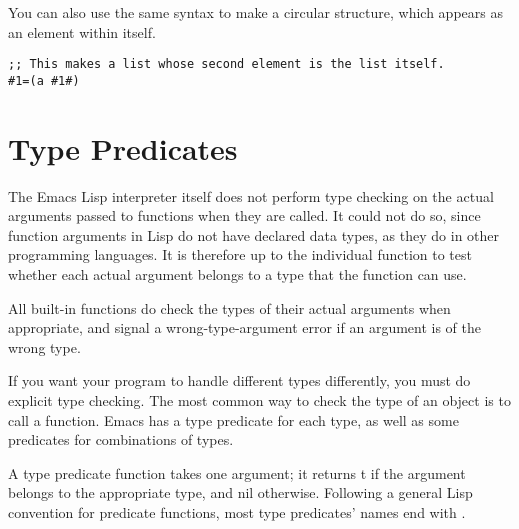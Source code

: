 You can also use the same syntax to make a circular structure, which appears as an element within itself. 
\begin{lstlisting}
;; This makes a list whose second element is the list itself.
#1=(a #1#)
\end{lstlisting}


\section{Type Predicates}
\label{sec:type-predicates}

The Emacs Lisp interpreter itself does not perform type checking on the actual arguments passed to functions when they are called.
It could not do so, since function arguments in Lisp do not have declared data types, as they do in other programming languages.
It is therefore up to the individual function to test whether each actual argument belongs to a type that the function can use.


All built-in functions do check the types of their actual arguments when appropriate, and signal a wrong-type-argument error if an argument is of the wrong type.


If you want your program to handle different types differently, you must do explicit type checking.
The most common way to check the type of an object is to call a  function.
Emacs has a type predicate for each type, as well as some predicates for combinations of types.


A type predicate function takes one argument; it returns t if the argument belongs to the appropriate type, and nil otherwise.
Following a general Lisp convention for predicate functions, most type predicates’ names end with .

